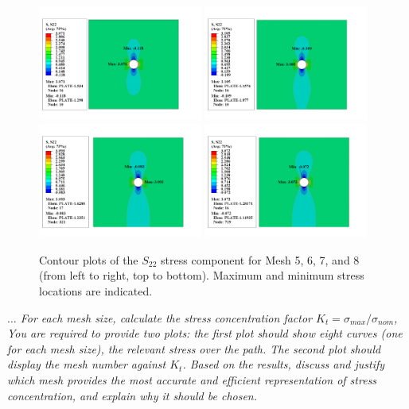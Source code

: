 \documentclass[12pt]{article}
\begin{document}
    \begin{figure}[H]
    \centering
    \includegraphics[width=0.48\textwidth]{images/S22_Mesh5.png}
    \includegraphics[width=0.48\textwidth]{images/S22_Mesh6.png}\\[-1.1em]
    \includegraphics[width=0.48\textwidth]{images/S22_Mesh7.png}
    \includegraphics[width=0.48\textwidth]{images/S22_Mesh8.png}
    \caption{Contour plots of the $S_{22}$ stress component for Mesh 5, 6, 7, and 8 (from left to right, top to bottom). Maximum and minimum stress locations are indicated.}
    \end{figure}

\vspace{1em}
\textit{$\dots$ For each mesh size, calculate the stress concentration factor $K_t = \sigma_{max} / \sigma_{nom}$, 
You are required to provide two plots: the first plot should show eight curves 
(one for each mesh size), the relevant stress over the path. 
The second plot should display the mesh number against $K_t$. 
Based on the results, discuss and justify which mesh provides the most accurate and 
efficient representation of stress concentration, and explain why it should be chosen.}
\end{document}
